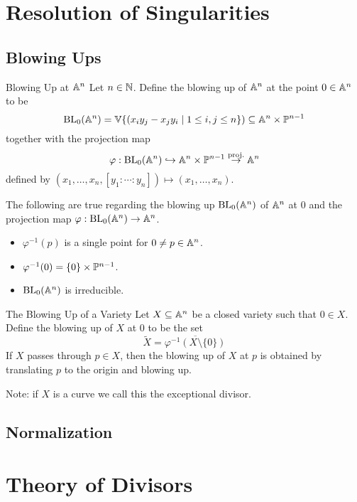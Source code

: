 \documentclass[a4paper]{article}
\begin{document}
\pagebreak
\section{Resolution of Singularities}
\subsection{Blowing Ups}
\begin{defn}{Blowing Up at $\mathbb{A}^n$}{} Let $n\in\mathbb{N}$. Define the blowing up of $\mathbb{A}^n$ at the point $0\in\mathbb{A}^n$ to be $$\text{BL}_0(\mathbb{A}^n)=\mathbb{V}\{(x_iy_j-x_jy_i\;|\;1\leq i,j\leq n\})\subseteq\mathbb{A}^n\times\mathbb{P}^{n-1}$$ together with the projection map $$\varphi:\text{BL}_0(\mathbb{A}^n)\hookrightarrow\mathbb{A}^n\times\mathbb{P}^{n-1}\overset{\text{proj.}}{\rightarrow}\mathbb{A}^n$$ defined by $(x_1,\dots,x_n,[y_1:\cdots:y_n])\mapsto(x_1,\dots,x_n)$. 
\end{defn}

\begin{prp}{}{} The following are true regarding the blowing up $\text{BL}_0(\mathbb{A}^n)$ of $\mathbb{A}^n$ at $0$ and the projection map $\varphi:\text{BL}_0(\mathbb{A}^n)\to\mathbb{A}^n$. 
\begin{itemize}
\item $\varphi^{-1}(p)$ is a single point for $0\neq p\in\mathbb{A}^n$. 
\item $\varphi^{-1}(0)=\{0\}\times\mathbb{P}^{n-1}$. 
\item $\text{BL}_0(\mathbb{A}^n)$ is irreducible. 
\end{itemize}
\end{prp}

\begin{defn}{The Blowing Up of a Variety}{} Let $X\subseteq\mathbb{A}^n$ be a closed variety such that $0\in X$. Define the blowing up of $X$ at $0$ to be the set $$\widetilde{X}=\overline{\varphi^{-1}(X\setminus\{0\})}$$ If $X$ passes through $p\in X$, then the blowing up of $X$ at $p$ is obtained by translating $p$ to the origin and blowing up. 
\end{defn}

Note: if $X$ is a curve we call this the exceptional divisor. 

\subsection{Normalization}

\pagebreak
\section{Theory of Divisors}
\end{document}
